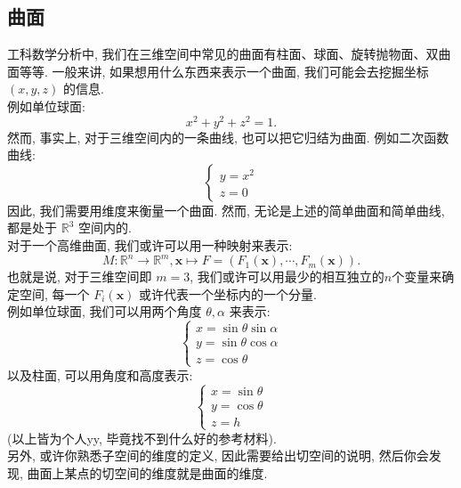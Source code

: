 \documentclass[lang = cn]{elegantpaper}
\begin{document}
\subsection{曲面}
\noindent
工科数学分析中, 我们在三维空间中常见的曲面有柱面、球面、旋转抛物面、双曲面等等. 一般来讲, 如果想用什么东西来表示一个曲面, 我们可能会去挖掘坐标 $(x,y,z)$ 的信息.\\
例如单位球面:
\begin{equation*}
    x^2 + y^2 + z^2 = 1.
\end{equation*}
然而, 事实上, 对于三维空间内的一条曲线, 也可以把它归结为曲面. 例如二次函数曲线:
\begin{equation*}
\begin{cases}
    y = x^2\\
    z = 0
\end{cases}
\end{equation*}
因此, 我们需要用维度来衡量一个曲面. 然而, 无论是上述的简单曲面和简单曲线, 都是处于 $\mathbb{R}^3$ 空间内的.\\
对于一个高维曲面, 我们或许可以用一种映射来表示:
\begin{equation*}
    M:\mathbb{R}^n \rightarrow \mathbb{R}^m,\bm{x}\mapsto F=(F_1(\bm{x}),\cdots,F_m(\bm{x})).
\end{equation*}
也就是说, 对于三维空间即 $m=3$, 我们或许可以用最少的相互独立的$n$个变量来确定空间, 每一个 $F_i(\bm{x})$ 或许代表一个坐标内的一个分量.\\
例如单位球面, 我们可以用两个角度 $\theta,\alpha$ 来表示:
\begin{equation*}
\begin{cases}
    x = \sin \theta \sin \alpha\\
    y = \sin \theta \cos \alpha\\
    z = \cos \theta
\end{cases}
\end{equation*}
以及柱面, 可以用角度和高度表示:
\begin{equation*}
\begin{cases}
    x = \sin \theta\\
    y = \cos \theta\\
    z = h
\end{cases}
\end{equation*}
(以上皆为个人yy, 毕竟找不到什么好的参考材料).\\
另外, 或许你熟悉子空间的维度的定义, 因此需要给出切空间的说明, 然后你会发现, 曲面上某点的切空间的维度就是曲面的维度.
\end{document}
